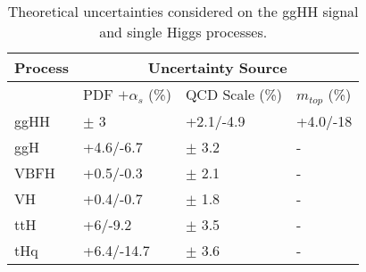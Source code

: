 \begin{table}[htb!]
  \centering
  \begin{tabular}{l|l|l|l}
    \hline 
    \hline
     Process & \multicolumn{3}{c}{Uncertainty Source} \\
    \hline
      & PDF $+ \alpha_s$ (\%) & QCD Scale (\%) & $m_{top}$ (\%)  \\
    \hline
    \hline
    ggHH & $\pm$ 3 & +2.1/-4.9 & +4.0/-18 \\
    \hline
    
    ggH & +4.6/-6.7 & $\pm$ 3.2 & - \\ 
    VBFH & +0.5/-0.3  & $\pm$ 2.1 & - \\
    VH & +0.4/-0.7  & $\pm$ 1.8 & - \\
    ttH & +6/-9.2  &  $\pm$ 3.5 & - \\
    tHq & +6.4/-14.7  & $\pm$ 3.6 & - \\ 

    \hline
  \end{tabular}
  \caption{
    Theoretical uncertainties considered on the ggHH signal and single Higgs processes.
  }
  \label{tab:ThUncertainties2}
\end{table}

